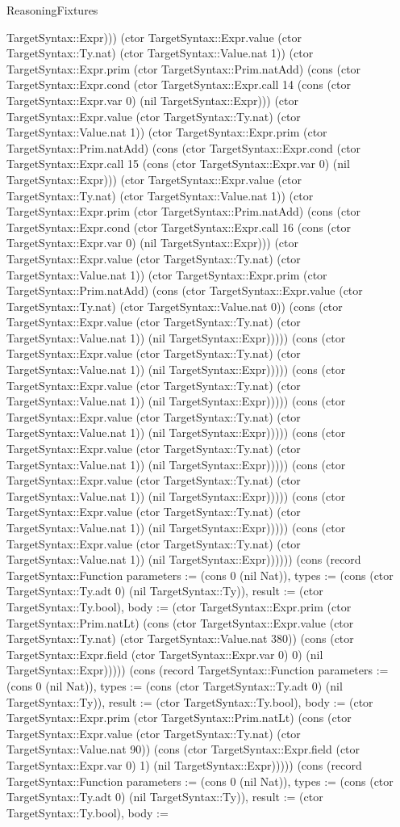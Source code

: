 \begin{lexlean}{ReasoningFixtures}
\begin{semanticmodule}
{TargetSyntax::Expr))) (ctor TargetSyntax::Expr.value (ctor TargetSyntax::Ty.nat) (ctor TargetSyntax::Value.nat 1)) (ctor TargetSyntax::Expr.prim (ctor TargetSyntax::Prim.natAdd) (cons (ctor TargetSyntax::Expr.cond (ctor TargetSyntax::Expr.call 14 (cons (ctor TargetSyntax::Expr.var 0) (nil TargetSyntax::Expr))) (ctor TargetSyntax::Expr.value (ctor TargetSyntax::Ty.nat) (ctor TargetSyntax::Value.nat 1)) (ctor TargetSyntax::Expr.prim (ctor TargetSyntax::Prim.natAdd) (cons (ctor TargetSyntax::Expr.cond (ctor TargetSyntax::Expr.call 15 (cons (ctor TargetSyntax::Expr.var 0) (nil TargetSyntax::Expr))) (ctor TargetSyntax::Expr.value (ctor TargetSyntax::Ty.nat) (ctor TargetSyntax::Value.nat 1)) (ctor TargetSyntax::Expr.prim (ctor TargetSyntax::Prim.natAdd) (cons (ctor TargetSyntax::Expr.cond (ctor TargetSyntax::Expr.call 16 (cons (ctor TargetSyntax::Expr.var 0) (nil TargetSyntax::Expr))) (ctor TargetSyntax::Expr.value (ctor TargetSyntax::Ty.nat) (ctor TargetSyntax::Value.nat 1)) (ctor TargetSyntax::Expr.prim (ctor TargetSyntax::Prim.natAdd) (cons (ctor TargetSyntax::Expr.value (ctor TargetSyntax::Ty.nat) (ctor TargetSyntax::Value.nat 0)) (cons (ctor TargetSyntax::Expr.value (ctor TargetSyntax::Ty.nat) (ctor TargetSyntax::Value.nat 1)) (nil TargetSyntax::Expr))))) (cons (ctor TargetSyntax::Expr.value (ctor TargetSyntax::Ty.nat) (ctor TargetSyntax::Value.nat 1)) (nil TargetSyntax::Expr))))) (cons (ctor TargetSyntax::Expr.value (ctor TargetSyntax::Ty.nat) (ctor TargetSyntax::Value.nat 1)) (nil TargetSyntax::Expr))))) (cons (ctor TargetSyntax::Expr.value (ctor TargetSyntax::Ty.nat) (ctor TargetSyntax::Value.nat 1)) (nil TargetSyntax::Expr))))) (cons (ctor TargetSyntax::Expr.value (ctor TargetSyntax::Ty.nat) (ctor TargetSyntax::Value.nat 1)) (nil TargetSyntax::Expr))))) (cons (ctor TargetSyntax::Expr.value (ctor TargetSyntax::Ty.nat) (ctor TargetSyntax::Value.nat 1)) (nil TargetSyntax::Expr))))) (cons (ctor TargetSyntax::Expr.value (ctor TargetSyntax::Ty.nat) (ctor TargetSyntax::Value.nat 1)) (nil TargetSyntax::Expr))))) (cons (ctor TargetSyntax::Expr.value (ctor TargetSyntax::Ty.nat) (ctor TargetSyntax::Value.nat 1)) (nil TargetSyntax::Expr)))))}) (cons (record TargetSyntax::Function {parameters := (cons 0 (nil Nat)), types := (cons (ctor TargetSyntax::Ty.adt 0) (nil TargetSyntax::Ty)), result := (ctor TargetSyntax::Ty.bool), body := (ctor TargetSyntax::Expr.prim (ctor TargetSyntax::Prim.natLt) (cons (ctor TargetSyntax::Expr.value (ctor TargetSyntax::Ty.nat) (ctor TargetSyntax::Value.nat 380)) (cons (ctor TargetSyntax::Expr.field (ctor TargetSyntax::Expr.var 0) 0) (nil TargetSyntax::Expr))))}) (cons (record TargetSyntax::Function {parameters := (cons 0 (nil Nat)), types := (cons (ctor TargetSyntax::Ty.adt 0) (nil TargetSyntax::Ty)), result := (ctor TargetSyntax::Ty.bool), body := (ctor TargetSyntax::Expr.prim (ctor TargetSyntax::Prim.natLt) (cons (ctor TargetSyntax::Expr.value (ctor TargetSyntax::Ty.nat) (ctor TargetSyntax::Value.nat 90)) (cons (ctor TargetSyntax::Expr.field (ctor TargetSyntax::Expr.var 0) 1) (nil TargetSyntax::Expr))))}) (cons (record TargetSyntax::Function {parameters := (cons 0 (nil Nat)), types := (cons (ctor TargetSyntax::Ty.adt 0) (nil TargetSyntax::Ty)), result := (ctor TargetSyntax::Ty.bool), body := }
\end{semanticmodule}
\end{lexlean}
